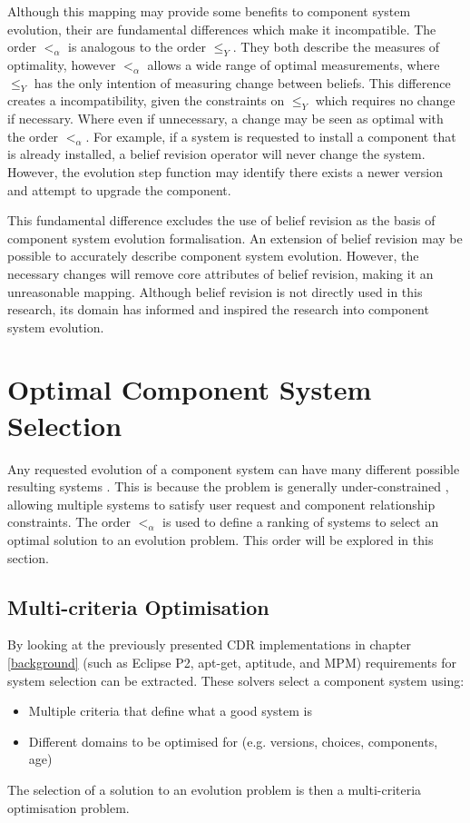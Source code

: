 Although this mapping may provide some benefits to component system evolution, their are fundamental differences which make it incompatible.
The order $<_{\alpha}$ is analogous to the order $\leq_{Y}$.
They both describe the measures of optimality, however $<_{\alpha}$ allows a wide range of optimal measurements,
where $\leq_Y$ has the only intention of measuring change between beliefs.
This difference creates a incompatibility, given the constraints on $\leq_Y$ which requires no change if necessary.
Where even if unnecessary, a change may be seen as optimal with the order $<_{\alpha}$.
For example, if a system is requested to install a component that is already installed, a belief revision operator will never change the system.
However, the evolution step function may identify there exists a newer version and attempt to upgrade the component.

This fundamental difference excludes the use of belief revision as the basis of component system evolution formalisation.
An extension of belief revision may be possible to accurately describe component system evolution. 
However, the necessary changes will remove core attributes of belief revision, making it an unreasonable mapping.
Although belief revision is not directly used in this research, its domain has informed and inspired the research into component system evolution.

\section{Optimal Component System Selection}
\label{formal.opt}
Any requested evolution of a component system can have many different possible resulting systems \citep{leBerre2010}.
This is because the problem is generally under-constrained \citep{Berre2008}, allowing multiple systems to satisfy user request and component relationship constraints.
The order $<_{\alpha}$ is used to define a ranking of systems to select an optimal solution to an evolution problem.
This order will be explored in this section.

\subsection{Multi-criteria Optimisation}
By looking at the previously presented CDR implementations in chapter \ref{background} (such as Eclipse P2, apt-get, aptitude, and MPM) requirements for system selection can be extracted.
These solvers select a component system using:
\begin{itemize}
  \item Multiple criteria that define what a good system is
  \item Different domains to be optimised for (e.g. versions, choices, components, age)
\end{itemize} 
The selection of a solution to an evolution problem is then a multi-criteria optimisation problem.

